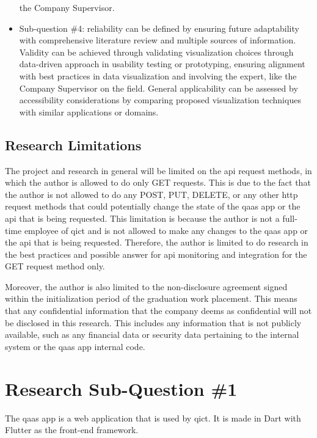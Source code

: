 \begin{multicols}{2}
\begin{itemize}[label=-]
                  the Company Supervisor.
            \item Sub-question \#4: reliability can be defined by ensuring future adaptability with comprehensive
                  literature review and multiple sources of information. Validity can be achieved through validating
                  visualization choices through data-driven approach in usability testing or  prototyping, ensuring
                  alignment with best practices in data visualization and involving the expert, like the Company
                  Supervisor on the field. General applicability can be assessed by accessibility considerations by
                  comparing proposed visualization techniques with similar applications or domains.
      \end{itemize}
      \subsection{Research Limitations}
      The project and research in general will be limited on the \acrshort{api} request methods, in which the author 
      is allowed to do only GET requests. This is due to the fact that the author is not allowed to do any
      POST, PUT, DELETE, or any other \acrshort{http} request methods that could potentially change the state of the 
      \acrshort{qaas} app or the \acrshort{api} that is being requested. This limitation is because the author is not a 
      full-time employee of \acrshort{qict} and is not allowed to make any changes to the \acrshort{qaas} app or the 
      \acrshort{api} that is being requested. Therefore, the author is limited to do research in the best practices 
      and possible answer for \acrshort{api} monitoring and integration for the GET request method only.

      Moreover, the author is also limited to the non-disclosure agreement signed within the initialization period of 
      the graduation work placement. This means that any confidential information that the company deems as confidential
      will not be disclosed in this research. This includes any information that is not publicly available, such as any 
      financial data or security data pertaining to the internal system or the \acrshort{qaas} app internal code.
      \section{Research Sub-Question \#1}
      The \acrshort{qaas} app is a web application that is used by \acrshort{qict}. It is made in Dart with Flutter as
      the front-end framework.


\end{multicols}
